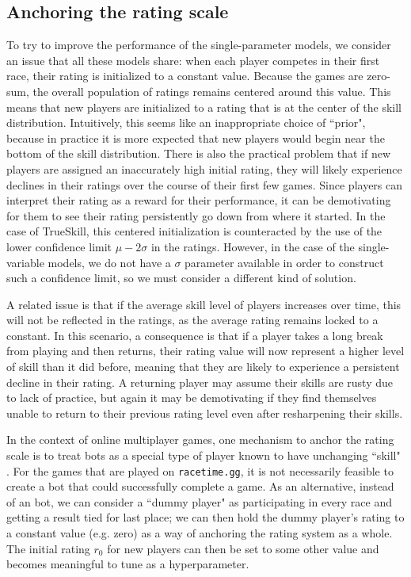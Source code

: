 \documentclass{article}
\begin{document}
	\subsection{Anchoring the rating scale}
	To try to improve the performance of the single-parameter models, we consider an issue that all these models share: when each player competes in their first race, their rating is initialized to a constant value. Because the games are zero-sum, the overall population of ratings remains centered around this value. This means that new players are initialized to a rating that is at the center of the skill distribution. Intuitively, this seems like an inappropriate choice of ``prior", because in practice it is more expected that new players would begin near the bottom of the skill distribution. There is also the practical problem that if new players are assigned an inaccurately high initial rating, they will likely experience declines in their ratings over the course of their first few games. Since players can interpret their rating as a reward for their performance, it can be demotivating for them to see their rating persistently go down from where it started. In the case of TrueSkill, this centered initialization is counteracted by the use of the lower confidence limit $\mu - 2\sigma$ in the ratings. However, in the case of the single-variable models, we do not have a $\sigma$ parameter available in order to construct such a confidence limit, so we must consider a different kind of solution.
	
	A related issue is that if the average skill level of players increases over time, this will not be reflected in the ratings, as the average rating remains locked to a constant. In this scenario, a consequence is that if a player takes a long break from playing and then returns, their rating value will now represent a higher level of skill than it did before, meaning that they are likely to experience a persistent decline in their rating. A returning player may assume their skills are rusty due to lack of practice, but again it may be demotivating if they find themselves unable to return to their previous rating level even after resharpening their skills.
	
	In the context of online multiplayer games, one mechanism to anchor the rating scale is to treat bots as a special type of player known to have unchanging ``skill" \cite{minka2018trueskill}. For the games that are played on \texttt{racetime.gg}, it is not necessarily feasible to create a bot that could successfully complete a game. As an alternative, instead of an bot, we can consider a ``dummy player" as participating in every race and getting a result tied for last place; we can then hold the dummy player's rating to a constant value (e.g. zero) as a way of anchoring the rating system as a whole. The initial rating $r_0$ for new players can then be set to some other value and becomes meaningful to tune as a hyperparameter.
	
\end{document}

